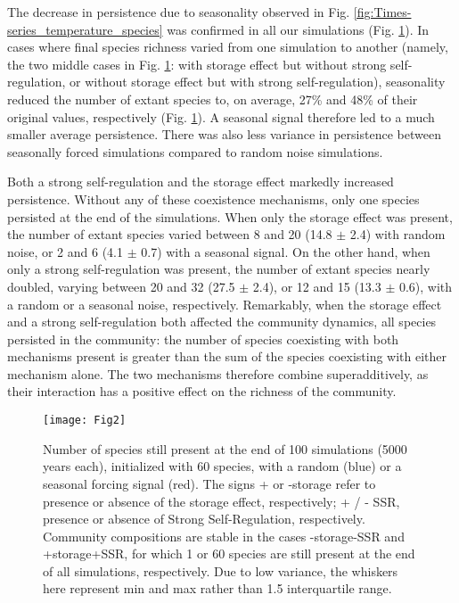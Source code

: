 \documentclass[a4paper,12pt]{article}
\begin{document}
The decrease in persistence due to seasonality observed in Fig. \ref{fig:Times-series_temperature_species}
was confirmed in all our simulations (Fig. \ref{fig:Persistence-of-species}).
In cases where final species richness varied from one simulation to
another (namely, the two middle cases in Fig. \ref{fig:Persistence-of-species}:
with storage effect but without strong self-regulation, or without
storage effect but with strong self-regulation), seasonality reduced
the number of extant species to, on average, 27\% and 48\% of their
original values, respectively (Fig. \ref{fig:Persistence-of-species}).
A seasonal signal therefore led to a much smaller average persistence.
There was also less variance in persistence between seasonally forced
simulations compared to random noise simulations.

Both a strong self-regulation and the storage effect markedly increased
persistence. Without any of these coexistence mechanisms, only one
species persisted at the end of the simulations. When only the storage
effect was present, the number of extant species varied between 8
and 20 (14.8 $\pm$ 2.4) with random noise, or 2 and 6 (4.1 $\pm$
0.7) with a seasonal signal. On the other hand, when only a strong
self-regulation was present, the number of extant species nearly doubled,
varying between 20 and 32 (27.5 $\pm$ 2.4), or 12 and 15 (13.3 $\pm$
0.6), with a random or a seasonal noise, respectively. Remarkably,
when the storage effect and a strong self-regulation both affected
the community dynamics, all species persisted in the community: the
number of species coexisting with both mechanisms present is greater
than the sum of the species coexisting with either mechanism alone.
The two mechanisms therefore combine superadditively, as their interaction
has a positive effect on the richness of the community.

\begin{figure}[!ht]
\begin{centering}
\texttt{[image: Fig2]}
\par\end{centering}
\caption{Number of species still present at the end of 100 simulations (5000
years each), initialized with 60 species, with a random (blue) or
a seasonal forcing signal (red). The signs + or -storage refer to
presence or absence of the storage effect, respectively; + / - SSR,
presence or absence of Strong Self-Regulation, respectively. Community
compositions are stable in the cases -storage-SSR and +storage+SSR,
for which 1 or 60 species are still present at the end of all simulations,
respectively. Due to low variance, the whiskers here represent min
and max rather than 1.5 interquartile range. \label{fig:Persistence-of-species}}
\end{figure}
\end{document}
